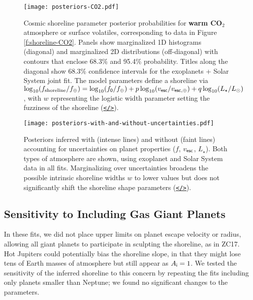 \documentclass[modern,linenumbers,trackchanges]{aastex7}
\begin{document}
\begin{figure*}[ht!]
\texttt{[image: posteriors-CO2.pdf]}

\caption{Cosmic shoreline parameter posterior probabilities for {\bf warm CO$_2$} atmosphere or surface volatiles, corresponding to data in Figure \ref{f:shoreline-CO2}. Panels show marginalized 1D histograms (diagonal) and marginalized 2D distributions (off-diagonal) with contours that enclose 68.3\% and 95.4\% probability. Titles along the diagonal show 68.3\% confidence intervals for the exoplanets + Solar System joint fit. The model parameters define a shoreline via $\log_{10} (f_{\rm shoreline}/f_\oplus) = \log_{10} (f_{\sf 0}/f_\oplus) + p \log_{10} (v_{\sf esc}/v_{\sf esc, \oplus}) + q \log_{10} (L_\star/L_\odot)$, with $w$ representing the logistic width parameter setting the fuzziness of the shoreline (\href{https://github.com/zkbt/shoreline/blob/main/notebooks/print-and-visualize-posteriors.ipynb}{\texttt{</>}}).}
\label{f:posteriors-CO2}
\end{figure*}




\begin{figure*}[ht!]
\texttt{[image: posteriors-with-and-without-uncertainties.pdf]}
\caption{Posteriors inferred with (intense lines) and without (faint lines) accounting for uncertainties on planet properties ($f$, $v_{\sf esc}$, $L_\star$). Both types of atmosphere are shown, using exoplanet and Solar System data in all fits. Marginalizing over uncertainties broadens the possible intrinsic shoreline widths $w$ to lower values but does not significantly shift the shoreline shape parameters (\href{https://github.com/zkbt/shoreline/blob/main/notebooks/print-and-visualize-posteriors.ipynb}{\texttt{</>}}).}
\label{f:posteriors-uncertainties}
\end{figure*}








\subsection{Sensitivity to Including Gas Giant Planets}
In these fits, we did not place upper limits on planet escape velocity or radius, allowing all giant planets to participate in sculpting the shoreline, as in ZC17. Hot Jupiters could potentially bias the shoreline slope, in that they might lose tens of Earth masses of atmosphere but still appear as $A_{\sf i} = 1$. We tested the sensitivity of the inferred shoreline to this concern by repeating the fits including only planets smaller than Neptune; we found no significant changes to the parameters. 
\end{document}
